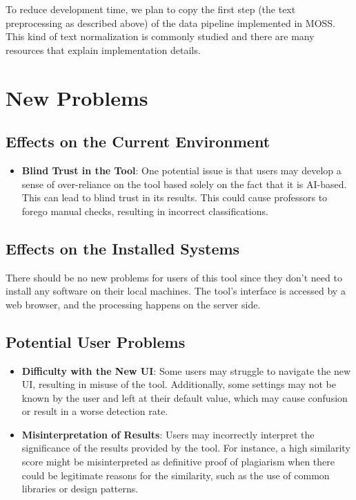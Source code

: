 \documentclass[12pt]{article}
\begin{document}
To reduce development time, we plan to copy the first step (the text preprocessing as described above) of the data pipeline implemented in MOSS. This kind of text normalization is commonly studied and there are many resources that explain implementation details.

\section{New Problems}
\subsection{Effects on the Current Environment}
\begin{itemize}
    \item \textbf{Blind Trust in the Tool}: One potential issue is that users may develop a sense of over-reliance on the tool based solely on the fact that it is AI-based. This can lead to blind trust in its results. This could cause professors to forego manual checks, resulting in incorrect classifications.
\end{itemize}

\subsection{Effects on the Installed Systems}
There should be no new problems for users of this tool since they don't need to install any software on their local machines. The tool's interface is accessed by a web browser, and the processing happens on the server side.

\subsection{Potential User Problems}
\begin{itemize}
    \item \textbf{Difficulty with the New UI}: Some users may struggle to navigate the new UI, resulting in misuse of the tool. Additionally, some settings may not be known by the user and left at their default value, which may cause confusion or result in a worse detection rate.

    \item \textbf{Misinterpretation of Results}: Users may incorrectly interpret the significance of the results provided by the tool. For instance, a high similarity score might be misinterpreted as definitive proof of plagiarism when there could be legitimate reasons for the similarity, such as the use of common libraries or design patterns.
\end{itemize}
\end{document}
